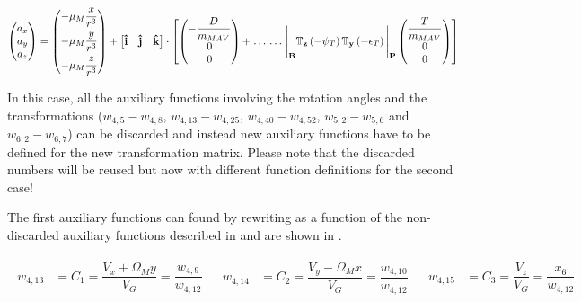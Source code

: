 \begin{equation} \label{eq:accAlTrans}
\begin{pmatrix}
a_{x}\\
a_{y}\\
a_{z}\\
\end{pmatrix}
=
\begin{pmatrix}
-\mu_{M}\dfrac{x}{r^{3}} \vspace{5pt} \\ \vspace{5pt}
-\mu_{M}\dfrac{y}{r^{3}}\\
-\mu_{M}\dfrac{z}{r^{3}}\\
\end{pmatrix}+
\left[
\begin{matrix}
\mathbf{\hat{i}} & \mathbf{\hat{j}} & \mathbf{\hat{k}} \\
\end{matrix}
\right]
\cdot
\left[
\begin{pmatrix}
-\dfrac{D}{m_{MAV}}\\
0\\
0\\
\end{pmatrix}
+  \right. \dots \\
\dotsc
 \left.
\Bigg|_{\mathbf{B}}\mathbb{T}_{\mathbf{z}}\left(-\psi_{T}\right)\mathbb{T}_{\mathbf{y}}\left(-\epsilon_{T}\right)\Bigg|_{\mathbf{P}}
\begin{pmatrix}
\dfrac{T}{m_{MAV}}\\
0\\
0\\
\end{pmatrix}
\right]
\end{equation}

\noindent
In this case, all the auxiliary functions involving the rotation angles and the transformations ($w_{4,5}-w_{4,8}$, $w_{4,13}-w_{4,25}$, $w_{4,40}-w_{4,52}$, $w_{5,2}-w_{5,6}$ and $w_{6,2}-w_{6,7}$) can be discarded and instead new auxiliary functions have to be defined for the new transformation matrix. Please note that the discarded numbers will be reused but now with different function definitions for the second case!

The first auxiliary functions can found by rewriting  as a function of the non-discarded auxiliary functions described in  and are shown in .

\begin{align} \label{eq:iHatAuxF}
\begin{split}
w_{4,13} &= C_{1} = \dfrac{V_{x}+\Omega_{M}y}{V_{G}} = \dfrac{w_{4,9}}{w_{4,12}}
\end{split}
&
\begin{split}
w_{4,14} &= C_{2} = \dfrac{V_{y}-\Omega_{M}x}{V_{G}} = \dfrac{w_{4,10}}{w_{4,12}}
\end{split}
&
\begin{split}
w_{4,15} &= C_{3} = \dfrac{V_{z}}{V_{G}} = \dfrac{x_{6}}{w_{4,12}}
\end{split}
\end{align}

